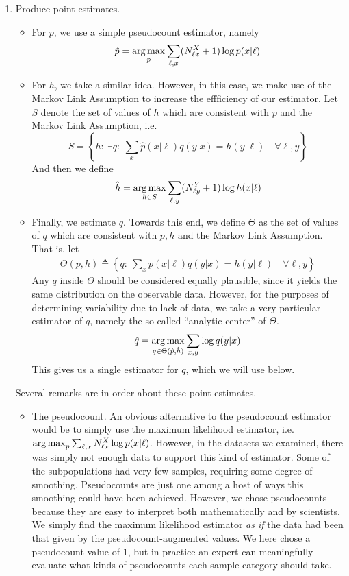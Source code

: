 \begin{enumerate}
\item Produce point estimates. 
\begin{itemize}
\item For $p$, we use a simple pseudocount estimator, namely
\[
\hat p = \operatorname*{arg\,max}_p \sum_{\ell,x} (N^X_{\ell x}+1) \log p(x|\ell)
\] 
\item For $h$, we take a similar idea.  However, in this case, we make use of the Markov Link Assumption to increase the effficiency of our estimator.  Let $S$ denote the set of values of $h$ which are consistent with $p$ and the Markov Link Assumption, i.e.
\[
S=\left\{h:\ \exists q:\ \sum_x \hat p(x|\ell)q(y|x)=h(y|\ell) \quad \forall \ell,y\right\}
\]
And then we define
\[
\hat h = \operatorname*{arg\,max}_{h\in S} \sum_{\ell,y} (N^Y_{\ell y}+1) \log h(x|\ell)
\] 
\item Finally, we estimate $q$.  Towards this end, we define $\Theta$ as the set of values of $q$ which are consistent with $p,h$ and the Markov Link Assumption.  That is, let 
\begin{align}\label{eq:thetadef}
\Theta(p,h) \triangleq \left\{q:\ \sum_x p(x|\ell)q(y|x)= h(y|\ell) \quad \forall \ell,y \right\}
\end{align}
Any $q$ inside $\Theta$ should be considered equally plausible, since it yields the same distribution on the observable data.  However, for the purposes of determining variability due to lack of data, we take a very particular estimator of $q$, namely the so-called ``analytic center'' of $\Theta$.
\[
\hat q = \operatorname*{arg\,max}_{q\in\Theta(\hat p,\hat h)} \sum_{x,y} \log q(y|x)
\]
This gives us a single estimator for $q$, which we will use below.  
\end{itemize}
Several remarks are in order about these point estimates.  
\begin{itemize}
\item The pseudocount.  An obvious alternative to the pseudocount estimator would be to simply use the maximum likelihood estimator, i.e. $\operatorname*{arg\,max}_p \sum_{\ell,x} N^X_{\ell x} \log p(x|\ell)$.  However, in the datasets we examined, there was simply not enough data to support this kind of estimator.  Some of the subpopulations had very few samples, requiring some degree of smoothing.  Pseudocounts are just one among a host of ways this smoothing could have been achieved.  However, we chose pseudocounts because they are easy to interpret both mathematically and by scientists.  We simply find the maximum likelihood estimator \emph{as if} the data had been that given by the pseudocount-augmented values.  We here chose a pseudocount value of 1, but in practice an expert can meaningfully evaluate what kinds of pseudocounts each sample category should take.  

\end{itemize}
\end{enumerate}
